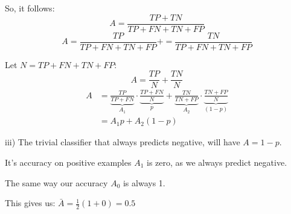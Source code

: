 \begin{answer}
So, it follows: \\
\[ A = \frac{TP+TN}{TP+FN+TN+FP} \]
\[ A = \frac{TP}{TP+FN+TN+FP} + = \frac{TN}{TP+FN+TN+FP} \]

Let $N = TP+FN+TN+FP$: \\
\[ A = \frac{TP}{N} + \frac{TN}{N} \]
\begin{align*}
    A &= \underbrace{\frac{TP}{TP+FN}}_{A_1} \cdot \underbrace{\frac{TP+FN}{N}}_{p} + \underbrace{\frac{TN}{TN+FP}}_{A_2} \cdot \underbrace{\frac{TN+FP}{N}}_{(1-p)} \\
    &= A_1 p + A_2 (1-p)
\end{align*}

iii) The trivial classifier that always predicts negative, will have $A = 1-p$.

It's accuracy on positive examples $A_1$ is zero, as we always predict negative.

The same way our accuracy $A_0$ is always 1.

This gives us:
$\bar{A} = \frac{1}{2}(1+0) = 0.5$


\end{answer}